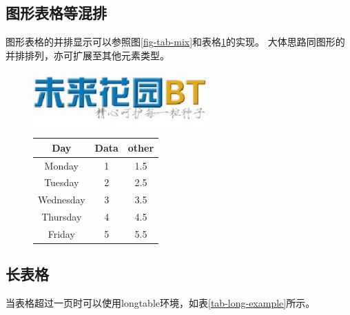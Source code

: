 \subsection{图形表格等混排}
\label{subsec-morefigtab}
图形表格的并排显示可以参照图\ref{fig-tab-mix}和表格\ref{tab-fig-mix}的实现。
大体思路同图形的并排排列，亦可扩展至其他元素类型。
\begin{figure}[h!]
    \begin{minipage}{0.5\textwidth}
        \centering
        \includegraphics[width=0.6\textwidth]{figure/fgbt.jpg}
        \label{fig-tab-mix}
    \end{minipage}
    \begin{minipage}{0.5\textwidth}
        \centering
        \begin{tabular}{c||c|c} \hline
            Day       & Data & other \\ \hline \hline
            Monday    & 1    & 1.5   \\
            Tuesday   & 2    & 2.5   \\
            Wednesday & 3    & 3.5   \\
            Thursday  & 4    & 4.5   \\
            Friday    & 5    & 5.5   \\ \hline
        \end{tabular}
        \label{tab-fig-mix}
    \end{minipage}
\end{figure}

\subsection{长表格}
\label{subsec-longtab}
当表格超过一页时可以使用longtable环境，如表\ref{tab-long-example}所示。

